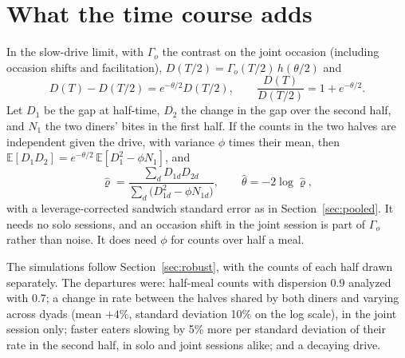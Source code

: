 \documentclass[12pt]{article}
\theoremstyle{definition}
\begin{document}
\section{What the time course adds}\label{sec:timecourse}

In the slow-drive limit, with $\Gamma_o$ the contrast on the joint occasion
(including occasion shifts and facilitation),
$D(T/2)=\Gamma_o(T/2)\,h(\theta/2)$ and
\begin{equation}\label{eq:halves}
D(T)-D(T/2)=e^{-\theta/2}D(T/2),\qquad \frac{D(T)}{D(T/2)}=1+e^{-\theta/2}.
\end{equation}
Let $D_1$ be the gap at half-time, $D_2$ the change in the gap over the second
half, and $N_1$ the two diners' bites in the first half. If the counts in the two
halves are independent given the drive, with variance $\phi$ times their mean, then
$\mathbb{E}[D_1D_2]=e^{-\theta/2}\,\mathbb{E}[D_1^2-\phi N_1]$, and
\[
\hat\varrho=\frac{\sum_dD_{1d}D_{2d}}{\sum_d\bigl(D_{1d}^2-\phi N_{1d}\bigr)},\qquad
\hat\theta=-2\log\hat\varrho ,
\]
with a leverage-corrected sandwich standard error as in Section~\ref{sec:pooled}.
It needs no solo sessions, and an occasion shift in the joint session is part of
$\Gamma_o$ rather than noise. It does need $\phi$ for counts over half a meal.

The simulations follow Section~\ref{sec:robust}, with the counts of each half drawn
separately. The departures were: half-meal counts with dispersion 0.9 analyzed with
0.7; a change in rate between the halves shared by both diners and varying across
dyads (mean $+4\%$, standard deviation 10\% on the log scale), in the joint session
only; faster eaters slowing by 5\% more per standard deviation of their rate in the
second half, in solo and joint sessions alike; and a decaying drive.
\end{document}
